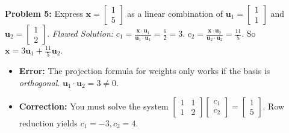 \documentclass[11pt, letterpaper]{article}
\theoremstyle{definition}
\theoremstyle{remark}
\begin{document}
\textbf{Problem 5:} Express $\mathbf{x} = \begin{bmatrix} 1 \\ 5 \end{bmatrix}$ as a linear combination of $\mathbf{u}_1 = \begin{bmatrix} 1 \\ 1 \end{bmatrix}$ and $\mathbf{u}_2 = \begin{bmatrix} 1 \\ 2 \end{bmatrix}$.
\textit{Flawed Solution:} $c_1 = \frac{\mathbf{x} \cdot \mathbf{u}_1}{\mathbf{u}_1 \cdot \mathbf{u}_1} = \frac{6}{2} = 3$. $c_2 = \frac{\mathbf{x} \cdot \mathbf{u}_2}{\mathbf{u}_2 \cdot \mathbf{u}_2} = \frac{11}{5}$. So $\mathbf{x} = 3\mathbf{u}_1 + \frac{11}{5}\mathbf{u}_2$.
\begin{itemize}
    \item \textbf{Error:} The projection formula for weights only works if the basis is \textit{orthogonal}. $\mathbf{u}_1 \cdot \mathbf{u}_2 = 3 \neq 0$.
    \item \textbf{Correction:} You must solve the system $\begin{bmatrix} 1 & 1 \\ 1 & 2 \end{bmatrix} \begin{bmatrix} c_1 \\ c_2 \end{bmatrix} = \begin{bmatrix} 1 \\ 5 \end{bmatrix}$. Row reduction yields $c_1 = -3, c_2 = 4$.
\end{itemize}
\end{document}
